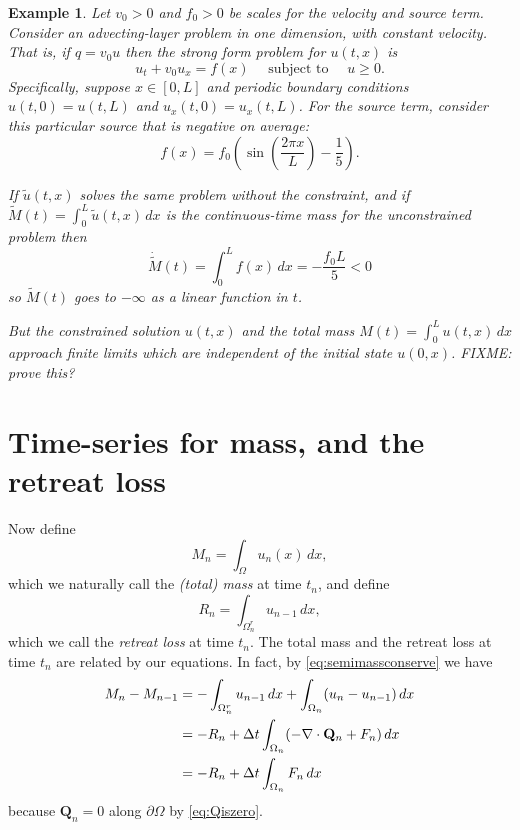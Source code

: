\documentclass[final,leqno,onefignum,onetabnum]{siamltex1213bueler}
\newtheorem{example}{Example}
\newcommand\bQ{\mathbf{Q}}
\newcommand{\Div}{\nabla\cdot}
\begin{document}
\begin{example}  Let $v_0>0$ and $f_0>0$ be scales for the velocity and source term.  Consider an advecting-layer problem in one dimension, with constant velocity.  That is, if $q = v_0 u$ then the strong form problem for $u(t,x)$ is
\begin{equation}
u_t + v_0 u_x = f(x) \quad \text{ subject to } \quad u\ge 0.  \label{eq:ex:advectlayer}
\end{equation}
Specifically, suppose $x\in[0,L]$ and periodic boundary conditions $u(t,0)=u(t,L)$ and $u_x(t,0)=u_x(t,L)$.  For the source term, consider this particular source that is negative on average:
    $$f(x) = f_0 \left(\sin\left(\frac{2\pi x}{L}\right) - \frac{1}{5}\right).$$

If $\tilde u(t,x)$ solves the same problem without the constraint, and if $\tilde M(t) = \int_0^L \tilde u(t,x)\,dx$ is the continuous-time mass for the unconstrained problem then
    $$\dot{\tilde M}(t) = \int_0^L f(x)\,dx = -\frac{f_0 L}{5} < 0$$
so $\tilde M(t)$ goes to $-\infty$ as a linear function in $t$.

But the constrained solution $u(t,x)$ and the total mass $M(t) = \int_0^L u(t,x)\,dx$ approach finite limits which are independent of the initial state $u(0,x)$.  FIXME: prove this?
\end{example}


\section{Time-series for mass, and the retreat loss}  \label{sec:timeseries}

Now define
\begin{equation}
M_n = \int_\Omega u_n(x)\,dx, \label{eq:totalmassdefn}
\end{equation}
which we naturally call the \emph{(total) mass} at time $t_n$, and define
\begin{equation}
R_n = \int_{\Omega_n^r} u_{n-1}\,dx, \label{eq:retreatlossdefn}
\end{equation}
which we call the \emph{retreat loss} at time $t_n$.  The total mass and the retreat loss at time $t_n$ are related by our equations.  In fact, by \eqref{eq:semimassconserve} we have
\begin{align}
M_n - M_{n-1} &=  - \int_{\Omega_n^r} u_{n-1}\,dx + \int_{\Omega_n} (u_n - u_{n-1})\,dx \label{eq:massstep} \\
   &= - R_n + \Delta t \int_{\Omega_n} (- \Div \bQ_n + F_n) \,dx \notag \\
   &= - R_n + \Delta t \int_{\Omega_n} F_n\,dx \notag
\end{align}
because $\bQ_n=0$ along $\partial \Omega$ by \eqref{eq:Qiszero}.
\end{document}
